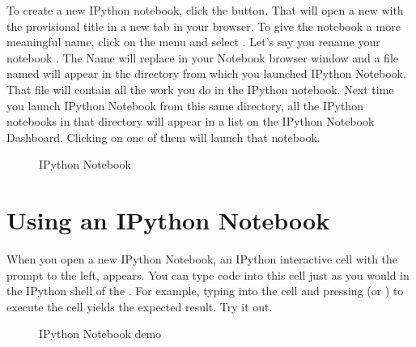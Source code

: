 \documentclass[letterpaper,10pt,english]{sphinxmanual}
\begin{document}
\sphinxAtStartPar
To create a new IPython notebook, click the  button.  That will open a new {\hyperref[\detokenize{apdx2/apdx2_ipynb:fig-ipynotebook}]{}} with the provisional title  in a new tab in your browser.  To give the notebook a more meaningful name, click on the  menu and select .  Let’s say you rename your notebook .  The Name  will replace  in your Notebook browser window and a file named  will appear in the directory from which you launched IPython Notebook.  That file will contain all the work you do in the IPython notebook.  Next time you launch IPython Notebook from this same directory, all the IPython notebooks in that directory will appear in a list on the IPython Notebook Dashboard.  Clicking on one of them will launch that notebook.

\begin{figure}[htbp]
\centering
\capstart

\noindent{}
\caption{IPython Notebook}\label{\detokenize{apdx2/apdx2_ipynb:id2}}\label{\detokenize{apdx2/apdx2_ipynb:fig-ipynotebook}}\end{figure}


\section{Using an IPython Notebook}
\label{\detokenize{apdx2/apdx2_ipynb:using-an-ipython-notebook}}
\sphinxAtStartPar
When you open a new IPython Notebook, an IPython interactive cell with the prompt  to the left, appears.  You can type code into this cell just as you would in the IPython shell of the {\hyperref[\detokenize{chap2/chap2_basics:fig-canopywindow}]{}}.  For example, typing  into the cell and pressing  (or ) to execute the cell yields the expected result.  Try it out.

\begin{figure}[htbp]
\centering
\capstart

\noindent{}
\caption{IPython Notebook demo}\label{\detokenize{apdx2/apdx2_ipynb:id3}}\label{\detokenize{apdx2/apdx2_ipynb:fig-firstipynbcells}}\end{figure}
\end{document}
